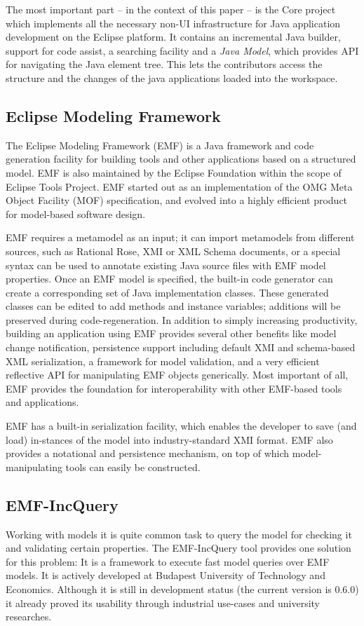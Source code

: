 The most important part -- in the context of this paper -- is the Core project
which implements all the necessary non-UI infrastructure for Java application
development on the Eclipse platform. It contains an incremental Java builder,
support for code assist, a searching facility and a \emph{Java Model}, which
provides API for navigating the Java element tree. This lets the contributors
access the structure and the changes of the java applications loaded into the
workspace.

\subsection{Eclipse Modeling Framework}
The Eclipse Modeling Framework (EMF) \cite{EMF} is a Java framework and code
generation facility for building tools and other applications based on a
structured model. EMF is also maintained by the Eclipse Foundation within the
scope of Eclipse Tools Project. EMF started out as an implementation of the OMG
Meta Object Facility (MOF) specification, and evolved into a highly efficient
product for model-based software design.

EMF requires a metamodel as an input; it can import metamodels from different
sources, such as Rational Rose, XMI or XML Schema documents, or a special syntax
can be used to annotate existing Java source files with EMF model properties.
Once an EMF model is specified, the built-in code generator can create a
corresponding set of Java implementation classes.
These generated classes can be edited to add methods and instance variables;
additions will be preserved during code-regeneration. In addition to simply
increasing productivity, building an application using EMF provides several
other benefits like model change notification, persistence support including
default XMI and schema-based XML serialization, a framework for model
validation, and a very efficient reflective API for manipulating EMF objects
generically. Most important of all, EMF provides the foundation for
interoperability with other EMF-based tools and applications.

EMF has a built-in serialization facility, which enables the developer to save
(and load) in-stances of the model into industry-standard XMI format. EMF also
provides a notational and persistence mechanism, on top of which
model-manipulating tools can easily be constructed.


\subsection{EMF-IncQuery} 
Working with models it is quite common task to query the model for checking it and
validating certain properties. The EMF-IncQuery \cite{EMFIncQuery} tool provides
one solution for this problem: It is a framework to execute fast model queries
over EMF models. It is actively developed at Budapest University of Technology
and Economics. Although it is still in development status (the current version
is 0.6.0) it already proved its usability through industrial use-cases and
university researches. %


